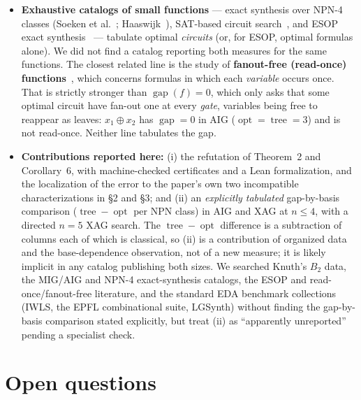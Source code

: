\documentclass[11pt]{article}
\DeclareMathOperator{\opt}{opt}
\DeclareMathOperator{\tree}{tree}
\DeclareMathOperator{\gapop}{gap}
\theoremstyle{plain}
\begin{document}
\begin{itemize}
  \item \textbf{Exhaustive catalogs of small functions} --- exact synthesis over NPN-4 classes
  (Soeken et al.~\cite{soeken2018}; Haaswijk~\cite{haaswijk-thesis}), SAT-based circuit
  search~\cite{kojevnikov2009}, and ESOP exact synthesis~\cite{riener2018} --- tabulate optimal
  \emph{circuits} (or, for ESOP, optimal formulas alone). We did not find a catalog reporting both
  measures for the same functions. The closest related line is the study of \textbf{fanout-free
  (read-once) functions}~\cite{hayes1975}, which concerns formulas in which each \emph{variable}
  occurs once. That is strictly stronger than $\gapop(f) = 0$, which only asks that some optimal
  circuit have fan-out one at every \emph{gate}, variables being free to reappear as leaves:
  $x_1 \oplus x_2$ has $\gapop = 0$ in AIG ($\opt = \tree = 3$) and is not read-once. Neither line
  tabulates the gap.

  \item \textbf{Contributions reported here:} (i) the refutation of Theorem~2 and Corollary~6, with
  machine-checked certificates and a Lean formalization, and the localization of the error to the
  paper's own
  two incompatible characterizations in \S2 and \S3; and (ii) an \emph{explicitly tabulated}
  gap-by-basis comparison ($\tree - \opt$ per NPN class) in AIG and XAG at $n \le 4$, with a
  directed $n = 5$ XAG search. The $\tree - \opt$ difference is a subtraction of columns each of
  which is classical, so (ii) is a contribution of organized data and the base-dependence
  observation, not of a new measure; it is likely implicit in any catalog publishing both sizes. We
  searched Knuth's $B_2$ data, the MIG/AIG and NPN-4 exact-synthesis catalogs, the ESOP and
  read-once/fanout-free literature, and the standard EDA benchmark collections (IWLS, the EPFL
  combinational suite, LGSynth) without finding the
  gap-by-basis comparison stated explicitly, but treat (ii) as ``apparently unreported'' pending a
  specialist check.
\end{itemize}

\section{Open questions}
\end{document}
